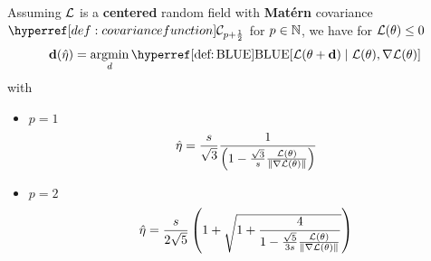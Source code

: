 
\begin{theorem}
	Assuming \(\mathcal{L}\) is a \textbf{centered} random field with \textbf{Matérn}
	covariance \(\C_{p+\frac12}\) for \(p\in\mathbb{N}\), we have for
	\(\mathcal{L}(\theta)\le 0\)
	\begin{equation*}
		\step(\hat{\lr})
		= \argmin_{d}
		\BLUE[\Loss(\param + \step) \mid \Loss(\param), \grad\Loss(\param)]
	\end{equation*}
	with
	\begin{itemize}
		\item \(p=1\)
		\begin{equation*}
			\hat{\eta}
			= \frac{s}{\sqrt{3}}\frac{1}{\left(
				1- \frac{\sqrt{3}}{s}\frac{\mathcal{L}(\theta)}{\|\nabla\mathcal{L}(\theta)\|}
			\right)}
		\end{equation*}

		\item \(p=2\)
		\begin{equation*}
			\hat{\eta}
			= \frac{s}{2\sqrt5} \left(
				1 + \sqrt{1+\frac4{1-\frac{\sqrt{5}}{3s}\frac{\mathcal{L}(\theta)}{\|\nabla\mathcal{L}(\theta)\|}}}
			\right)
		\end{equation*}
	\end{itemize}
\end{theorem}
